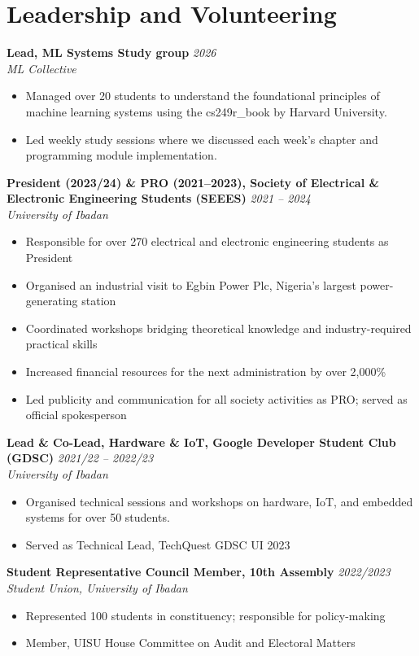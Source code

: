 \documentclass[10pt, a4paper]{article}
\newcommand{\cventry}[4]{%
  \noindent\textbf{#1} \hfill \textit{#2}\\%
  \textit{#3} \hfill \small{#4}\\[-4pt]%
}
\begin{document}
\section{Leadership and Volunteering}
\cventry{Lead, ML Systems Study group}{2026}{ML Collective}{}
\begin{itemize}
  \item Managed over 20 students to understand the foundational principles of machine learning systems using the cs249r\_book by Harvard University.

  \item Led weekly study sessions where we discussed each week's chapter and programming module implementation.
\end{itemize}
\cventry{President (2023/24) \& PRO (2021--2023), Society of Electrical \& Electronic Engineering Students (SEEES)}{2021 -- 2024}{University of Ibadan}{}
\begin{itemize}
  \item Responsible for over 270 electrical and electronic engineering students as President
  \item Organised an industrial visit to Egbin Power Plc, Nigeria's largest power-generating station
  \item Coordinated workshops bridging theoretical knowledge and industry-required practical skills
  \item Increased financial resources for the next administration by over 2{,}000\%
  \item Led publicity and communication for all society activities as PRO; served as official spokesperson
\end{itemize}

\vspace{4pt}
\cventry{Lead \& Co-Lead, Hardware \& IoT, Google Developer Student Club (GDSC)}{2021/22 -- 2022/23}{University of Ibadan}{}
\begin{itemize}
  \item Organised technical sessions and workshops on hardware, IoT, and embedded systems for over 50 students.
  \item Served as Technical Lead, TechQuest GDSC UI 2023
\end{itemize}

\vspace{4pt}
\cventry{Student Representative Council Member, 10th Assembly}{2022/2023}{Student Union, University of Ibadan}{}
\begin{itemize}
  \item Represented 100 students in constituency; responsible for policy-making
  \item Member, UISU House Committee on Audit and Electoral Matters
\end{itemize}
\end{document}
